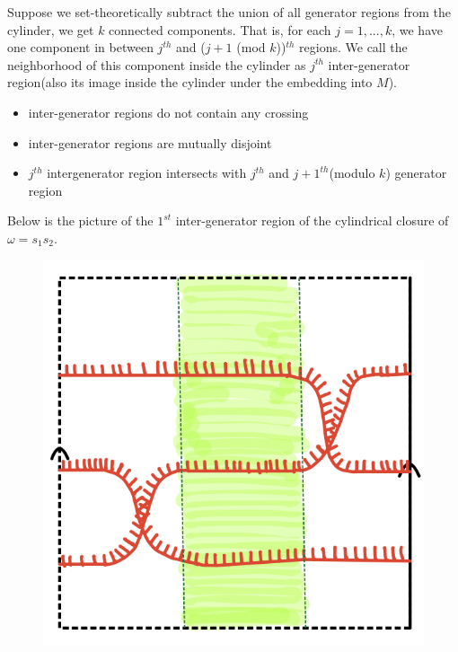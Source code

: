 \begin{definition}
Suppose we set-theoretically subtract the union of all generator regions from the cylinder, we get $k$ connected components. That is, for each $j = 1,...,k$, we have one component in between $j^{th}$ and ($j+1$ (mod $k$))$^{th}$ regions. We call the neighborhood of this component inside the cylinder as  $j^{th}$ inter-generator region(also its image inside the cylinder under the embedding into $M$).

\begin{itemize}
\item inter-generator regions do not contain any crossing
\item inter-generator regions are mutually disjoint
\item $j^{th}$ intergenerator region intersects with $j^{th}$ and $j+1^{th}$(modulo $k$) generator region
\end{itemize}
\end{definition}

Below is the picture of the $1^{st}$ inter-generator region of the cylindrical closure of $\omega = s_1 s_2$.

\begin{figure}[H] 
    \centering
    \includegraphics[scale = 0.55]{diagrams/natural_alternating_diagrams/7-1.png}
    \caption{}
    \label{fig:your-label}
\end{figure}


